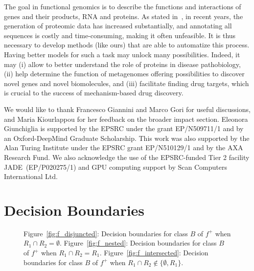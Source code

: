 \documentclass{article}
\begin{document}
The goal in functional genomics is to describe the functions and interactions of genes and their products, RNA and proteins. As stated in~\cite{nakano2019,radivojac2013}, in  recent years, the generation of proteomic data has increased substantially, and annotating all sequences is costly and time-consuming, making it often unfeasible. It is thus necessary to develop methods (like ours) that are able to automatize this process. Having better models for such a task may unlock many possibilities. Indeed, it may 
 (i)  allow to better understand the role of proteins in disease pathobiology,  (ii)   help determine the function of metagenomes offering possibilities to discover novel genes and novel biomolecules, and (iii)   facilitate finding drug targets, which is crucial to the success of mechanism-based drug discovery.











\begin{ack}
We would like to thank Francesco Giannini and Marco Gori for useful discussions, and Maria  Kiourlappou for her feedback on the broader impact section.
Eleonora Giunchiglia is supported by the EPSRC under the grant EP/N509711/1 and by an Oxford-DeepMind Graduate Scholarship.
This work was also supported by the Alan Turing Institute under the EPSRC grant EP/N510129/1 and by the AXA Research Fund. We also acknowledge the use of the EPSRC-funded Tier 2 facility JADE~(EP/P020275/1) and GPU computing support by Scan Computers International Ltd.
\end{ack}






\newpage

\appendix\label{sec:appendix}

\section{Decision Boundaries }\label{app:decbound}

\begin{figure}[h]
    \centering
     \caption{Figure~\ref{fig:f_disjuncted}: Decision boundaries for class $B$ of $f^+$ when $R_1 \cap R_2 = \emptyset$. Figure~\ref{fig:f_nested}: Decision boundaries for class $B$ of $f^+$ when $R_1 \cap R_2 = R_1$. Figure~\ref{fig:f_intersected}: Decision boundaries for class $B$ of $f^+$ when $R_1 \cap R_2 \not \in \{\emptyset, R_1\}$.}
\end{figure}
\end{document}
